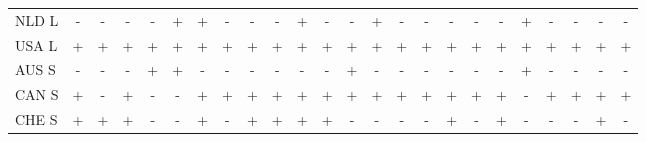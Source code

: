 \documentclass[12pt,bibliography=totoc]{article}
\begin{document}
\begin{appendices}
\begin{table}[H]
\begin{tabular}{l  cccccccc@{\hskip 0.2in}  cccccccc@{\hskip 0.2in}   ccccccc}
NLD L	&\cellcolor{red!25}-	&\cellcolor{red!25}-	&\cellcolor{red!25}-	&\cellcolor{red!25}-	&\cellcolor{green!25}+	&\cellcolor{green!25}+	&\cellcolor{red!25}-	&\cellcolor{red!25}-	&\cellcolor{red!25}-	&\cellcolor{green!25}+	&\cellcolor{red!25}-	&\cellcolor{red!25}-	&\cellcolor{green!25}+	&\cellcolor{red!25}-	&\cellcolor{red!25}-	&\cellcolor{red!25}-	&\cellcolor{red!25}-	&\cellcolor{red!25}-	&\cellcolor{green!25}+	&\cellcolor{red!25}-	&\cellcolor{red!25}-	&\cellcolor{red!25}-	&\cellcolor{red!25}-\\
USA L	&\cellcolor{green!25}+	&\cellcolor{green!25}+	&\cellcolor{green!25}+	&\cellcolor{green!25}+	&\cellcolor{green!25}+	&\cellcolor{green!25}+	&\cellcolor{green!25}+	&\cellcolor{green!25}+	&\cellcolor{green!25}+	&\cellcolor{green!25}+	&\cellcolor{green!25}+	&\cellcolor{green!25}+	&\cellcolor{green!25}+	&\cellcolor{green!25}+	&\cellcolor{green!25}+	&\cellcolor{green!25}+	&\cellcolor{green!25}+	&\cellcolor{green!25}+	&\cellcolor{green!25}+	&\cellcolor{green!25}+	&\cellcolor{green!25}+	&\cellcolor{green!25}+	&\cellcolor{green!25}+\\
AUS S	&\cellcolor{red!25}-	&\cellcolor{red!25}-	&\cellcolor{red!25}-	&\cellcolor{green!25}+	&\cellcolor{green!25}+	&\cellcolor{red!25}-	&\cellcolor{red!25}-	&\cellcolor{red!25}-	&\cellcolor{red!25}-	&\cellcolor{red!25}-	&\cellcolor{red!25}-	&\cellcolor{green!25}+	&\cellcolor{red!25}-	&\cellcolor{red!25}-	&\cellcolor{red!25}-	&\cellcolor{red!25}-	&\cellcolor{red!25}-	&\cellcolor{red!25}-	&\cellcolor{green!25}+	&\cellcolor{red!25}-	&\cellcolor{red!25}-	&\cellcolor{red!25}-	&\cellcolor{red!25}-\\
CAN S	&\cellcolor{green!25}+	&\cellcolor{red!25}-	&\cellcolor{green!25}+	&\cellcolor{red!25}-	&\cellcolor{red!25}-	&\cellcolor{green!25}+	&\cellcolor{green!25}+	&\cellcolor{green!25}+	&\cellcolor{green!25}+	&\cellcolor{green!25}+	&\cellcolor{green!25}+	&\cellcolor{green!25}+	&\cellcolor{green!25}+	&\cellcolor{green!25}+	&\cellcolor{green!25}+	&\cellcolor{green!25}+	&\cellcolor{green!25}+	&\cellcolor{green!25}+	&\cellcolor{red!25}-	&\cellcolor{green!25}+	&\cellcolor{green!25}+	&\cellcolor{green!25}+	&\cellcolor{green!25}+\\
CHE S	&\cellcolor{green!25}+	&\cellcolor{green!25}+	&\cellcolor{green!25}+	&\cellcolor{red!25}-	&\cellcolor{red!25}-	&\cellcolor{green!25}+	&\cellcolor{red!25}-	&\cellcolor{green!25}+	&\cellcolor{green!25}+	&\cellcolor{green!25}+	&\cellcolor{green!25}+	&\cellcolor{red!25}-	&\cellcolor{red!25}-	&\cellcolor{red!25}-	&\cellcolor{red!25}-	&\cellcolor{green!25}+	&\cellcolor{red!25}-	&\cellcolor{green!25}+	&\cellcolor{red!25}-	&\cellcolor{red!25}-	&\cellcolor{red!25}-	&\cellcolor{green!25}+	&\cellcolor{red!25}-\\

\end{tabular}
\end{table}
\end{appendices}
\end{document}
